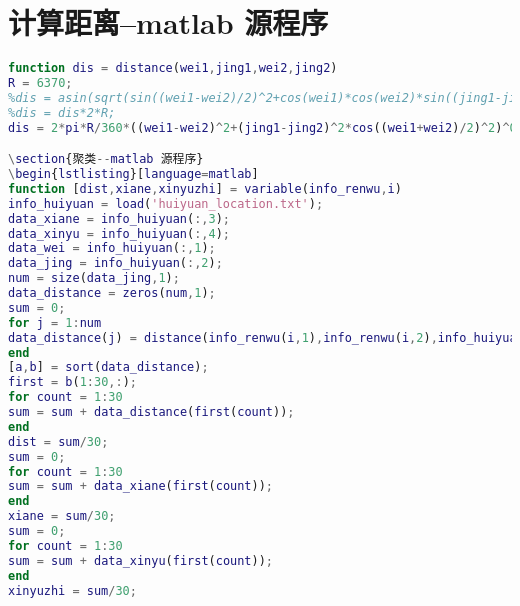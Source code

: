 \documentclass{cumcmthesis}
\begin{document}
\section{计算距离--matlab 源程序}
\begin{lstlisting}[language=matlab]
function dis = distance(wei1,jing1,wei2,jing2)
R = 6370;
%dis = asin(sqrt(sin((wei1-wei2)/2)^2+cos(wei1)*cos(wei2)*sin((jing1-jing2)/2)^2));
%dis = dis*2*R;
dis = 2*pi*R/360*((wei1-wei2)^2+(jing1-jing2)^2*cos((wei1+wei2)/2)^2)^0.5;

\section{聚类--matlab 源程序}
\begin{lstlisting}[language=matlab]
function [dist,xiane,xinyuzhi] = variable(info_renwu,i)
info_huiyuan = load('huiyuan_location.txt');
data_xiane = info_huiyuan(:,3);
data_xinyu = info_huiyuan(:,4);
data_wei = info_huiyuan(:,1);
data_jing = info_huiyuan(:,2);
num = size(data_jing,1);
data_distance = zeros(num,1);
sum = 0;
for j = 1:num
data_distance(j) = distance(info_renwu(i,1),info_renwu(i,2),info_huiyuan(j,1),info_huiyuan(j,2));
end
[a,b] = sort(data_distance);
first = b(1:30,:);
for count = 1:30
sum = sum + data_distance(first(count));
end
dist = sum/30;
sum = 0;
for count = 1:30
sum = sum + data_xiane(first(count));
end
xiane = sum/30;
sum = 0;
for count = 1:30
sum = sum + data_xinyu(first(count));
end
xinyuzhi = sum/30;

\end{lstlisting}
\end{document}
